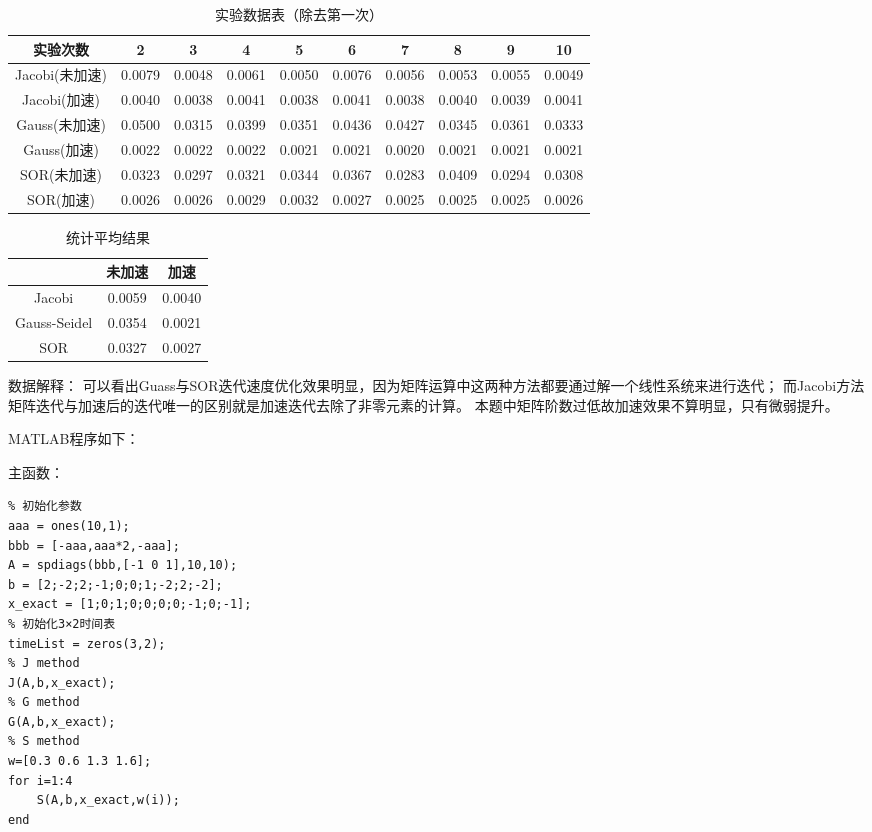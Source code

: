 \documentclass[12pt,a4paper,utf8]{ctexart}
\begin{document}
\begin{enumerate}
\begin{table}[htbp]

   \caption{实验数据表（除去第一次）}
	\begin{tabular}{ | c | c | c | c | c | c | c | c | c | c |}
		\hline
		实验次数 	            & 2 & 3 & 4 & 5 & 6 & 7 & 8 & 9 & 10 \\ 
		\hline
		Jacobi(未加速) 	      & 0.0079 & 0.0048 & 0.0061 & 0.0050 & 0.0076 & 0.0056 & 0.0053 & 0.0055 & 0.0049 \\ 
		\hline 
		Jacobi(加速)            & 0.0040 & 0.0038 & 0.0041 & 0.0038 & 0.0041 & 0.0038 & 0.0040 & 0.0039 & 0.0041 \\ 
		\hline 
      Gauss(未加速) 	         & 0.0500 & 0.0315 & 0.0399 & 0.0351 & 0.0436 & 0.0427 & 0.0345 & 0.0361 & 0.0333 \\ 
		\hline 
		Gauss(加速)             & 0.0022 & 0.0022 & 0.0022 & 0.0021 & 0.0021 & 0.0020 & 0.0021 & 0.0021 & 0.0021 \\ 
		\hline 
      SOR(未加速)  	         & 0.0323 & 0.0297 & 0.0321 & 0.0344 & 0.0367 & 0.0283 & 0.0409 & 0.0294 & 0.0308 \\ 
		\hline 
		SOR(加速)               & 0.0026 & 0.0026 & 0.0029 & 0.0032 & 0.0027 & 0.0025 & 0.0025 & 0.0025 & 0.0026 \\ 
		\hline 
	\end{tabular}
\end{table}


\begin{table}[htbp]
   \centering
   \caption{统计平均结果}
	\begin{tabular}{ | c | c | c |}
		\hline
			            & 未加速 	& 加速	 \\ 
		\hline
		Jacobi 	      & 0.0059	& 0.0040		 \\ 
		\hline 
		Gauss-Seidel   & 0.0354 & 0.0021		 \\ 
      \hline 
		SOR            & 0.0327 & 0.0027		 \\
		\hline 
	\end{tabular}
\end{table}

数据解释：
可以看出Guass与SOR迭代速度优化效果明显，因为矩阵运算中这两种方法都要通过解一个线性系统来进行迭代；
而Jacobi方法矩阵迭代与加速后的迭代唯一的区别就是加速迭代去除了非零元素的计算。
本题中矩阵阶数过低故加速效果不算明显，只有微弱提升。


MATLAB程序如下：

主函数：
\begin{lstlisting}[frame=single]
% ex1.a.b
% 初始化参数
aaa = ones(10,1);
bbb = [-aaa,aaa*2,-aaa];
A = spdiags(bbb,[-1 0 1],10,10);
b = [2;-2;2;-1;0;0;1;-2;2;-2];
x_exact = [1;0;1;0;0;0;0;-1;0;-1];
% 初始化3×2时间表
timeList = zeros(3,2);
% J method
J(A,b,x_exact);
% G method
G(A,b,x_exact);
% S method
w=[0.3 0.6 1.3 1.6];
for i=1:4
    S(A,b,x_exact,w(i));
end


\end{lstlisting}
\end{enumerate}
\end{document}
